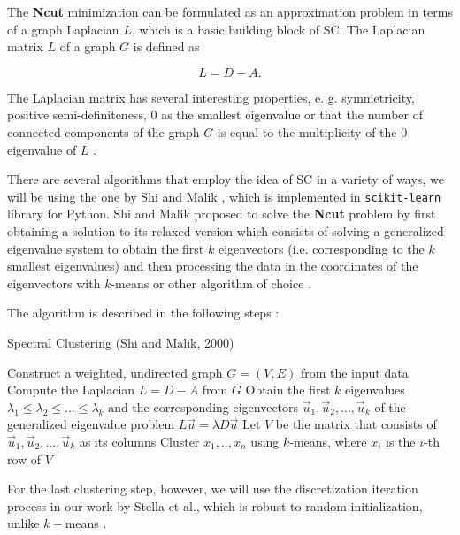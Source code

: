 The \textbf{Ncut} minimization can be formulated as an approximation problem in terms of a graph Laplacian $L$, which is a basic building block of SC. The Laplacian matrix $L$ of a graph $G$ is defined as

\begin{equation}
L = D - A.
\end{equation}

The Laplacian matrix has several interesting properties, e. g. symmetricity, positive semi-definiteness, $0$ as the smallest eigenvalue or that the number of connected components of the graph $G$ is equal to the multiplicity of the $0$ eigenvalue of $L$ \cite{von2007tutorial}. 

There are several algorithms that employ the idea of SC in a variety of ways, we will be using the one by Shi and Malik \cite{shi2000normalized}, which is implemented in \texttt{scikit-learn} \cite{scikit-learn} library for Python. Shi and Malik proposed to solve the \textbf{Ncut} problem by first obtaining a solution to its relaxed version which consists of solving a generalized eigenvalue system to obtain the first $k$ eigenvectors  (i.e. corresponding to the $k$ smallest eigenvalues) and then processing the data in the coordinates of the eigenvectors with $k$-means or other algorithm of choice \cite{shi2000normalized, von2007tutorial}.

The algorithm is described in the following steps \cite{von2007tutorial}:
\bigskip

\begin{algorithm}[H]
\renewcommand{\thealgorithm}{}
\caption{Spectral Clustering (Shi and Malik, 2000)}
\label{protocol1}
\begin{algorithmic}[1]
\STATE Construct a weighted, undirected graph $G = (V, E)$ from the input data
\STATE Compute the Laplacian $L = D - A$ from $G$
\STATE Obtain the first $k$ eigenvalues $\lambda_1 \leq \lambda_2 \leq ... \leq \lambda_k$ and the corresponding eigenvectors $\Vec{u}_1, \Vec{u}_2, ..., \Vec{u}_k$ of the generalized eigenvalue problem $L\Vec{u} = \lambda D \Vec{u}$
\STATE Let $V$ be the matrix that consists of $\Vec{u}_1, \Vec{u}_2, ..., \Vec{u}_k$ as its columns
\STATE Cluster $x_1, .., x_n$ using $k$-means, where $x_i$ is the $i$-th row of $V$
\end{algorithmic}
\end{algorithm} 
\bigskip

For the last clustering step, however, we will use the discretization iteration process in our work by Stella et al., which is robust to random initialization, unlike $k-$means  \cite{stella2003multiclass}.

